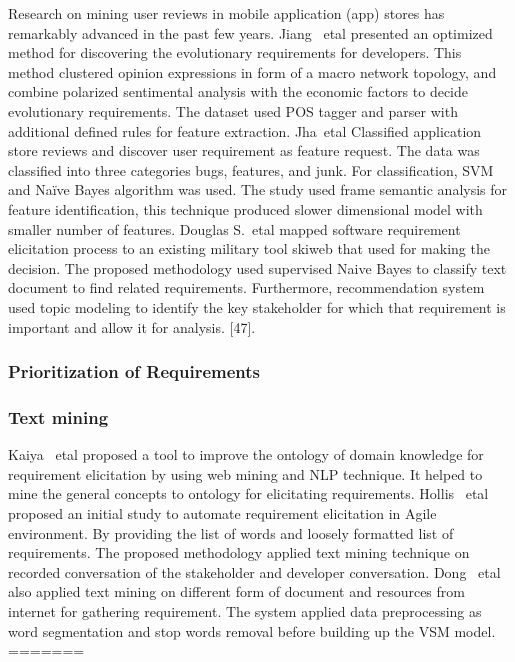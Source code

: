 Research on mining user reviews in mobile application (app) stores has remarkably advanced in the past few years. Jiang ~etal \cite{Jiang:2014} presented an optimized method for discovering the evolutionary requirements for developers. This method clustered opinion expressions in form of a macro network topology, and combine polarized sentimental analysis with the economic factors to decide evolutionary requirements. The dataset used POS tagger and parser with additional defined rules for feature extraction.                   Jha~etal \cite{Jha:2017} Classified application store reviews and discover user requirement as feature request. The data was classified into three categories bugs, features, and junk. For classification, SVM and Naïve Bayes algorithm was used. The study used frame semantic analysis for feature identification, this technique produced slower dimensional model with smaller number of features. Douglas S.~etal \cite{Douglas:S2008} mapped software requirement elicitation process to an existing military tool skiweb that used for making the decision. The proposed methodology used supervised Naive Bayes to classify text document to find related requirements. Furthermore, recommendation system used topic modeling to identify the key stakeholder for which that requirement is important and allow it for analysis.  [47]. \\

\subsubsection{Prioritization of Requirements} 

\subsubsection{Text mining}
Kaiya ~etal \cite {Kaiya:2010} proposed a tool to improve the ontology of domain knowledge for requirement elicitation by using web mining and NLP technique. It helped to mine the general concepts to ontology for elicitating requirements. Hollis ~etal   \cite{Hollis2017} proposed an initial study to automate requirement elicitation in Agile environment. By providing the list of words and loosely formatted list of requirements. The proposed methodology applied text mining technique on recorded conversation of the stakeholder and developer conversation. Dong ~etal \cite{dong2010}  also applied text mining on different form of  document and resources from internet for  gathering requirement. The system applied data preprocessing as word segmentation and stop words removal before building up the VSM model.
=======
